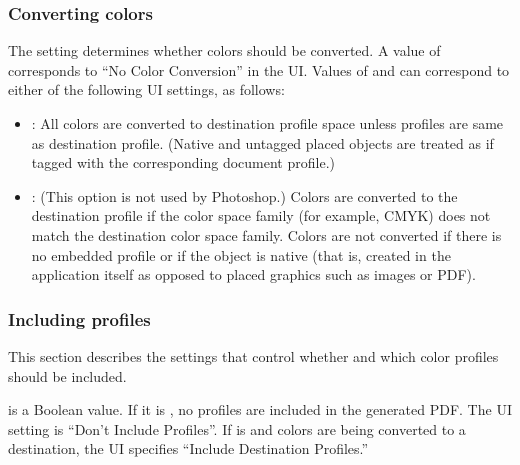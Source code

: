 \documentclass[letterpaper,12pt,english,openany,oneside]{sphinxmanual}
\begin{document}
\subsubsection{Converting colors}
\label{\detokenize{PDF_Create_UsingSettings:converting-colors}}
The  setting determines whether colors should be converted. A value of  corresponds to “No Color Conversion” in the UI. Values of  and  can correspond to either of the following UI settings, as follows:
\begin{itemize}
\item {} 
: All colors are converted to destination profile space unless profiles are same as destination profile. (Native and untagged placed objects are treated as if tagged with the corresponding document profile.)

\item {} 
: (This option is not used by Photoshop.) Colors are converted to the destination profile if the color space family (for example, CMYK) does not match the destination color space family. Colors are not converted if there is no embedded profile or if the object is native (that is, created in the application itself as opposed to placed graphics such as images or PDF).

\end{itemize}


\subsubsection{Including profiles}
\label{\detokenize{PDF_Create_UsingSettings:including-profiles}}
This section describes the settings that control whether and which color profiles should be included.

 is a Boolean value. If it is  , no profiles are included in the generated PDF. The UI setting is “Don’t Include Profiles”. If  is  and colors are being converted to a destination, the UI specifies “Include Destination Profiles.”
\end{document}
